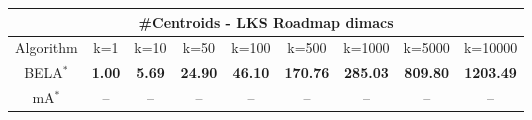 \begin{tabular}{c|cccccccc}\toprule
\multicolumn{9}{c}{#Centroids - LKS Roadmap dimacs}\\ \midrule
Algorithm & k=1 & k=10 & k=50 & k=100 & k=500 & k=1000 & k=5000 & k=10000 \\ \midrule
BELA$^*$ & \textbf{1.00} & \textbf{5.69} & \textbf{24.90} & \textbf{46.10} & \textbf{170.76} & \textbf{285.03} & \textbf{809.80} & \textbf{1203.49} \\
mA$^*$ & -- & -- & -- & -- & -- & -- & -- & -- \\ \bottomrule 
\end{tabular}
